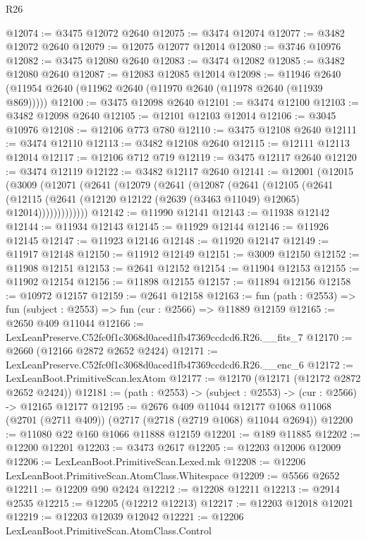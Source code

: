 \begin{lexlean}{R26}
\begin{coremodule}
@12074 := @3475 @12072 @2640
@12075 := @3474 @12074
@12077 := @3482 @12072 @2640
@12079 := @12075 @12077 @12014
@12080 := @3746 @10976
@12082 := @3475 @12080 @2640
@12083 := @3474 @12082
@12085 := @3482 @12080 @2640
@12087 := @12083 @12085 @12014
@12098 := @11946 @2640 (@11954 @2640 (@11962 @2640 (@11970 @2640 (@11978 @2640 (@11939 @869)))))
@12100 := @3475 @12098 @2640
@12101 := @3474 @12100
@12103 := @3482 @12098 @2640
@12105 := @12101 @12103 @12014
@12106 := @3045 @10976
@12108 := @12106 @773 @780
@12110 := @3475 @12108 @2640
@12111 := @3474 @12110
@12113 := @3482 @12108 @2640
@12115 := @12111 @12113 @12014
@12117 := @12106 @712 @719
@12119 := @3475 @12117 @2640
@12120 := @3474 @12119
@12122 := @3482 @12117 @2640
@12141 := @12001
    (@12015
      (@3009
        (@12071
          (@2641
            (@12079
              (@2641
                (@12087
                  (@2641
                    (@12105
                      (@2641
                        (@12115
                          (@2641 (@12120 @12122 (@2639 (@3463 @11049) @12065) @12014)))))))))))))
@12142 := @11990 @12141
@12143 := @11938 @12142
@12144 := @11934 @12143
@12145 := @11929 @12144
@12146 := @11926 @12145
@12147 := @11923 @12146
@12148 := @11920 @12147
@12149 := @11917 @12148
@12150 := @11912 @12149
@12151 := @3009 @12150
@12152 := @11908 @12151
@12153 := @2641 @12152
@12154 := @11904 @12153
@12155 := @11902 @12154
@12156 := @11898 @12155
@12157 := @11894 @12156
@12158 := @10972 @12157
@12159 := @2641 @12158
@12163 := fun (path : @2553) => fun (subject : @2553) => fun (cur : @2566) => @11889 @12159
@12165 := @2650 @409 @11044
@12166 := LexLeanPreserve.C52fc0f1c3068d0aced1fb47369ccdcd6.R26.__fits_7
@12170 := @2660 (@12166 @2872 @2652 @2424)
@12171 := LexLeanPreserve.C52fc0f1c3068d0aced1fb47369ccdcd6.R26.__enc_6
@12172 := LexLeanBoot.PrimitiveScan.lexAtom
@12177 := @12170 (@12171 (@12172 @2872 @2652 @2424))
@12181 := (path : @2553) -> (subject : @2553) -> (cur : @2566) -> @12165 @12177
@12195 := @2676
    @409
    @11044
    @12177
    @1068
    @11068
    (@2701 (@2711 @409))
    (@2717 (@2718 (@2719 @1068) @11044 @2694))
@12200 := @11080 @22 @160 @1066 @11888 @12159
@12201 := @189 @11885
@12202 := @12200 @12201
@12203 := @3473 @2617
@12205 := @12203 @12006 @12009
@12206 := LexLeanBoot.PrimitiveScan.Lexed.mk
@12208 := @12206 LexLeanBoot.PrimitiveScan.AtomClass.Whitespace
@12209 := @5566 @2652
@12211 := @12209 @90 @2424
@12212 := @12208 @12211
@12213 := @2914 @2535
@12215 := @12205 (@12212 @12213)
@12217 := @12203 @12018 @12021
@12219 := @12203 @12039 @12042
@12221 := @12206 LexLeanBoot.PrimitiveScan.AtomClass.Control

\end{coremodule}
\end{lexlean}
